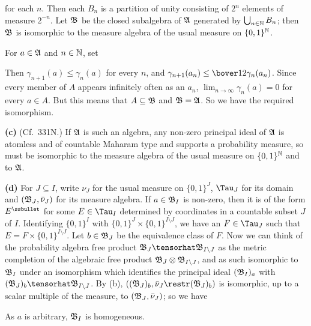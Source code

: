 {

\noindent for each $n$.   Then each $B_n$ is a partition of unity
consisting of $2^n$ elements of measure $2^{-n}$.   Let $\frak B$ be the
closed subalgebra of $\frak A$ generated by $\bigcup_{n\in\Bbb N}B_n$;
then $\frak B$ is isomorphic to the measure algebra of the usual measure on
$\{0,1\}^{\Bbb N}$.

For $a\in\frak A$ and $n\in\Bbb N$, set


\noindent Then $\gamma_{n+1}(a)\le\gamma_n(a)$ for every $n$, and
$\gamma_{n+1}(a_n)\le\bover12\gamma_n(a_n)$.   Since every member of $A$
appears infinitely often as an $a_n$, $\lim_{n\to\infty}\gamma_n(a)=0$ for
every $a\in A$.   But this means that $A\subseteq\frak B$ and
$\frak B=\frak A$.   So we have the required isomorphism.

\medskip

{\bf (c)} (Cf.\ 331N.)   If $\frak A$ is such an algebra,
any non-zero principal ideal of $\frak A$ is atomless and of
countable Maharam type and supports a probability measure,
so must be isomorphic to the measure algebra of the usual measure on
$\{0,1\}^{\Bbb N}$ and to $\frak A$.

\medskip

{\bf (d)} For $J\subseteq I$,
write $\nu_J$ for the usual measure on $\{0,1\}^J$, $\Tau_J$ for its
domain and $(\frak B_J,\bar\nu_J)$
for its measure algebra.   If $a\in\frak B_I$ is
non-zero, then it is of the form $E^{\ssbullet}$ for some $E\in\Tau_I$
determined by coordinates in a countable subset $J$ of $I$.   Identifying
$\{0,1\}^I$ with $\{0,1\}^J\times\{0,1\}^{I\setminus J}$, we have an
$F\in\Tau_J$ such that $E=F\times\{0,1\}^{I\setminus J}$.   Let
$b\in\frak B_J$ be the equivalence class of $F$.   Now we can
think of the probability algebra free product
$\frak B_J\tensorhat\frak B_{I\setminus J}$ as the metric completion of the
algebraic free product $\frak B_J\otimes\frak B_{I\setminus J}$, and as
such isomorphic to $\frak B_I$ under an isomorphism which identifies the
principal ideal $(\frak B_I)_a$ with
$(\frak B_J)_b\tensorhat\frak B_{I\setminus J}$.   By (b),
$((\frak B_J)_b,\bar\nu_J\restr(\frak B_J)_b)$ is isomorphic, up to a
scalar multiple of the measure, to $(\frak B_J,\bar\nu_J)$;  so we have


\noindent As $a$ is arbitrary, $\frak B_I$ is homogeneous.
}%

